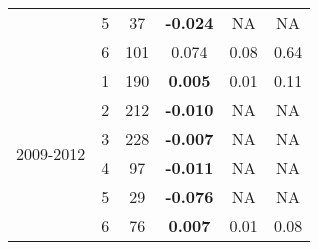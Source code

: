 \begin{table}[htbp]
\begin{tabular}{rrrrrr}
    \multicolumn{1}{c}{} & \multicolumn{1}{c}{5} & \multicolumn{1}{c}{37} & \multicolumn{1}{c}{\textbf{-0.024 }} & \multicolumn{1}{c}{NA} & \multicolumn{1}{c}{NA} \\
    \multicolumn{1}{c}{} & \multicolumn{1}{c}{6} & \multicolumn{1}{c}{101} & \multicolumn{1}{c}{0.074 } & \multicolumn{1}{c}{0.08 } & \multicolumn{1}{c}{0.64 } \\\midrule
    \multicolumn{1}{c}{\multirow{6}[2]{*}{\begin{sideways}2009-2012\end{sideways}}} & \multicolumn{1}{c}{1} & \multicolumn{1}{c}{190} & \multicolumn{1}{c}{\textbf{0.005 }} & \multicolumn{1}{c}{0.01 } & \multicolumn{1}{c}{0.11 } \\
    \multicolumn{1}{c}{} & \multicolumn{1}{c}{2} & \multicolumn{1}{c}{212} & \multicolumn{1}{c}{\textbf{-0.010 }} & \multicolumn{1}{c}{NA} & \multicolumn{1}{c}{NA} \\
    \multicolumn{1}{c}{} & \multicolumn{1}{c}{3} & \multicolumn{1}{c}{228} & \multicolumn{1}{c}{\textbf{-0.007 }} & \multicolumn{1}{c}{NA} & \multicolumn{1}{c}{NA} \\
    \multicolumn{1}{c}{} & \multicolumn{1}{c}{4} & \multicolumn{1}{c}{97} & \multicolumn{1}{c}{\textbf{-0.011 }} & \multicolumn{1}{c}{NA} & \multicolumn{1}{c}{NA} \\
    \multicolumn{1}{c}{} & \multicolumn{1}{c}{5} & \multicolumn{1}{c}{29} & \multicolumn{1}{c}{\textbf{-0.076 }} & \multicolumn{1}{c}{NA} & \multicolumn{1}{c}{NA} \\
    \multicolumn{1}{c}{} & \multicolumn{1}{c}{6} & \multicolumn{1}{c}{76} & \multicolumn{1}{c}{\textbf{0.007 }} & \multicolumn{1}{c}{0.01 } & \multicolumn{1}{c}{0.08 } \\
    \bottomrule
    \end{tabular}%
  \label{tab:SO4TVPHPA}%
\end{table}%
